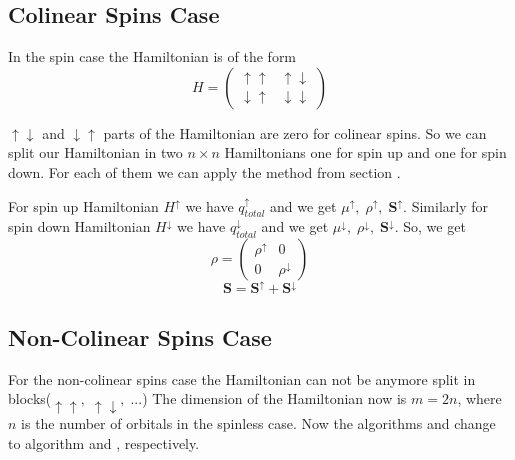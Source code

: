 \subsection{Colinear Spins Case}
\par{In the spin case the Hamiltonian is of the form}
\begin{equation}
\label{spinH}
H=\left(
\begin{array}{c|c}
\uparrow \uparrow & \uparrow \downarrow \\
\hline
\downarrow \uparrow & \downarrow \downarrow
\end{array}
\right)
\end{equation}
\par{$\uparrow \downarrow$ and $\downarrow \uparrow$ parts of the Hamiltonian are
zero for colinear spins. So we can split our Hamiltonian in two $n \times n$
Hamiltonians one for spin up and one for spin down. For each of them we can apply 
the method from section }.
\par{For spin up Hamiltonian $H^{\uparrow}$ we have $q_{total}^{\uparrow}$ and we get
$\mu^{\uparrow},\;\rho^{\uparrow},\;\bm{S}^{\uparrow}$. Similarly for spin down Hamiltonian $H^{\downarrow}$ 
we have $q_{total}^{\downarrow}$ and we get
$\mu^{\downarrow},\;\rho^{\downarrow},\;\bm{S}^{\downarrow}$. So, we get}
\begin{equation}
\rho=\left(
\begin{array}{c|c}
\rho^{\uparrow} & 0 \\
\hline
0 & \rho^{\downarrow}
\end{array}
\right)
\end{equation}
\begin{equation}
\bm{S}=\bm{S^{\uparrow}}+\bm{S^{\downarrow}}
\end{equation}
\subsection{Non-Colinear Spins Case}
\par{For the non-colinear spins case the Hamiltonian  can not be anymore split in blocks($\uparrow \uparrow,\;\uparrow \downarrow,\;...$)
The dimension of the Hamiltonian now is $m=2n$, where $n$ is the number of orbitals
in the spinless case. Now the algorithms  and  change
to algorithm  and , respectively.}


